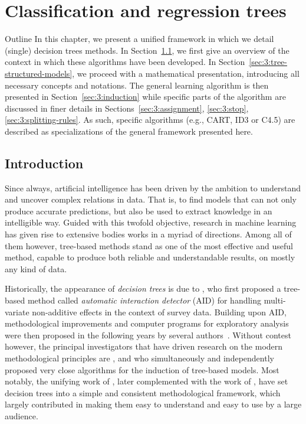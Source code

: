 \chapter{Classification and regression trees}\label{ch:cart}

\begin{remark}{Outline}
In this chapter, we present a unified framework in which we detail (single)
decision trees methods. In Section~\ref{sec:3:introduction}, we first give an
overview of the context in which these algorithms have been developed. In
Section~\ref{sec:3:tree-structured-models}, we proceed with a mathematical
presentation, introducing all necessary concepts and notations. The general
learning algorithm is then presented in Section~\ref{sec:3:induction} while
specific parts of the algorithm are discussed in finer details in
Sections~\ref{sec:3:assignment}, \ref{sec:3:stop}, \ref{sec:3:splitting-rules}.
As such, specific algorithms (e.g., CART, ID3 or C4.5) are described as
specializations of the general framework presented here.
\end{remark}

\section{Introduction}
\label{sec:3:introduction}

Since always, artificial intelligence has been driven by the ambition to
understand and uncover complex relations in data. That is, to find models that
can not only produce accurate predictions, but also be used to extract
knowledge in an intelligible way. Guided with this twofold objective, research
in machine learning has given rise to extensive bodies works in a myriad of
directions. Among all of them however, tree-based methods stand as one of
the most effective and useful method, capable to produce both reliable and
understandable results, on mostly any kind of data.

Historically, the appearance of \textit{decision trees} is due to
\citet{morgan:1963}, who first proposed a tree-based method called
\textit{automatic interaction detector} (AID) for handling multi-variate
non-additive effects in the context of survey data. Building upon AID,
methodological improvements and computer programs for exploratory analysis were
then proposed in the following years by several
authors~\citep{sonquist:1970,messenger:1972,gillo:1972,sonquist:1974}. Without
contest however, the principal investigators that have driven research on the modern
methodological principles are \citet{breiman:1978a,breiman:1978b},
\citet{friedman:1977,friedman:1979} and \citet{quinlan:1979,quinlan:1986} who
simultaneously and independently proposed very close algorithms for the
induction of tree-based models. Most notably, the unifying work of
\citet{breiman:1984}, later complemented with the work of \citet{quinlan:1993},
have set decision trees into a simple and consistent methodological framework,
which largely contributed in making them easy to understand and easy to use by
a large audience.

